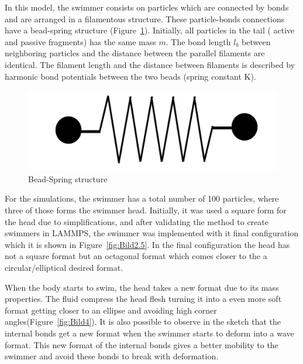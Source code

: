 In this model, the swimmer consists on particles which are connected by bonds and are arranged in a filamentous structure. These particle-bonds connections have a bead-spring 
structure (Figure~\ref{fig:Bild2}). Initially, all particles in the tail ( active and passive fragments) has the same mass $m$. The bond length $l_{b}$ between neighboring
particles and the distance between the parallel filaments are identical. The filament length and the distance between filaments is described by harmonic bond potentials between
the two beads (spring constant K).\par

\begin{figure}[ht]
\centering
  \begin{footnotesize}
  \includegraphics[scale=0.15]{images/bead-spring.png}
  \caption[Bead-Spring Structure]{Bead-Spring structure}
  \label{fig:Bild2}
  \end{footnotesize}
\end{figure} 

For the simulations, the swimmer has a total number of 100 particles, where three of those forms the swimmer head. Initially, it was used a square form for the head due to
simplifications, and after validating the method to create swimmers in LAMMPS, the swimmer was implemented with it final configuration which it is shown in Figure~\ref{fig:Bild2.5}.
In the final configuration the head has not a square format but an octagonal format which comes closer to the a circular/elliptical desired format.\par 
When the body starts to swim, the head takes a new format due to its mass properties. The fluid compress the head flesh turning it into a even more soft format getting closer to an 
ellipse and avoiding high corner angles(Figure~\ref{fig:Bild4}). It is also possible to observe in the sketch that the internal bonds get a new format when the swimmer starts to
deform into a wave format. This new format of the internal bonds gives a better mobility to the swimmer and avoid these bonds to break with deformation.  \par

